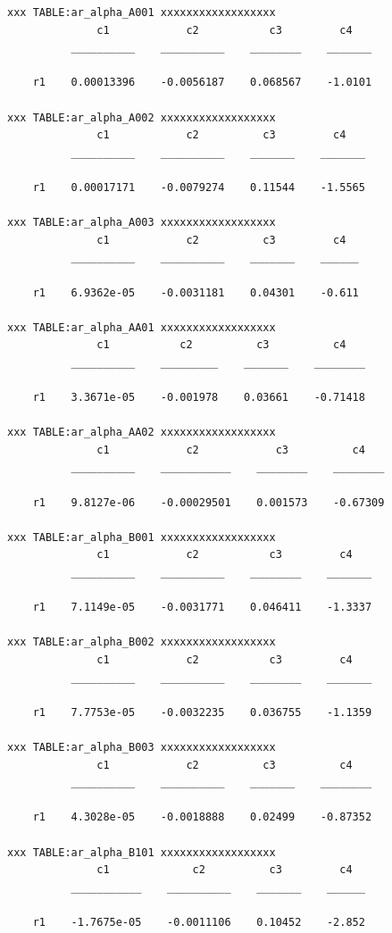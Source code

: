 \documentclass[
]{book}
\begin{document}
\begin{verbatim}
xxx TABLE:ar_alpha_A001 xxxxxxxxxxxxxxxxxx
              c1            c2           c3         c4   
          __________    __________    ________    _______

    r1    0.00013396    -0.0056187    0.068567    -1.0101

xxx TABLE:ar_alpha_A002 xxxxxxxxxxxxxxxxxx
              c1            c2          c3         c4   
          __________    __________    _______    _______

    r1    0.00017171    -0.0079274    0.11544    -1.5565

xxx TABLE:ar_alpha_A003 xxxxxxxxxxxxxxxxxx
              c1            c2          c3         c4  
          __________    __________    _______    ______

    r1    6.9362e-05    -0.0031181    0.04301    -0.611

xxx TABLE:ar_alpha_AA01 xxxxxxxxxxxxxxxxxx
              c1           c2          c3          c4   
          __________    _________    _______    ________

    r1    3.3671e-05    -0.001978    0.03661    -0.71418

xxx TABLE:ar_alpha_AA02 xxxxxxxxxxxxxxxxxx
              c1            c2            c3          c4   
          __________    ___________    ________    ________

    r1    9.8127e-06    -0.00029501    0.001573    -0.67309

xxx TABLE:ar_alpha_B001 xxxxxxxxxxxxxxxxxx
              c1            c2           c3         c4   
          __________    __________    ________    _______

    r1    7.1149e-05    -0.0031771    0.046411    -1.3337

xxx TABLE:ar_alpha_B002 xxxxxxxxxxxxxxxxxx
              c1            c2           c3         c4   
          __________    __________    ________    _______

    r1    7.7753e-05    -0.0032235    0.036755    -1.1359

xxx TABLE:ar_alpha_B003 xxxxxxxxxxxxxxxxxx
              c1            c2          c3          c4   
          __________    __________    _______    ________

    r1    4.3028e-05    -0.0018888    0.02499    -0.87352

xxx TABLE:ar_alpha_B101 xxxxxxxxxxxxxxxxxx
              c1             c2          c3         c4  
          ___________    __________    _______    ______

    r1    -1.7675e-05    -0.0011106    0.10452    -2.852


\end{verbatim}
\end{document}
